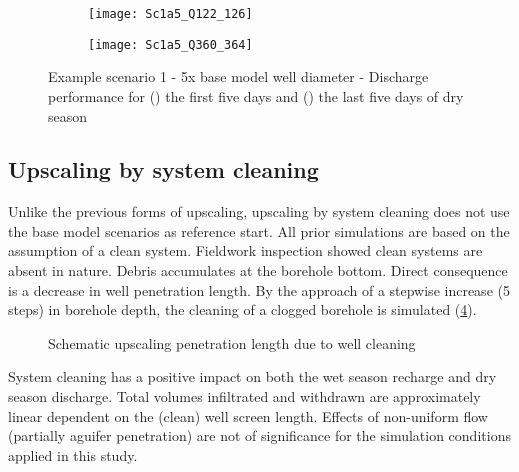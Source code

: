 \begin{figure}[H]
	\centering
	\begin{subfigure}[b]{0.5\linewidth}
		\centering\texttt{[image: Sc1a5\_Q122\_126]}
		\captionsetup{justification=centering}		
		\caption{\label{fig:Sc1a5_Q122_126}}
		\end{subfigure}\hfill
	\begin{subfigure}[b]{0.5\linewidth}
        \centering\texttt{[image: Sc1a5\_Q360\_364]}
		\captionsetup{justification=centering}		
		\caption{\label{fig:Sc1a5_Q360_364}}
		\end{subfigure}
		\captionsetup{justification=centering}	
	\caption{Example scenario 1 - 5x base model well diameter - Discharge performance for () the first five days and () the last five days of dry season} 
	\label{fig:Example_Sc1_5x_diam_discharge}
\end{figure} 


\subsection{Upscaling by system cleaning}
\label{subsec:Up_clean}
Unlike the previous forms of upscaling, upscaling by system cleaning does not use the base model scenarios as reference start. All prior simulations are based on the assumption of a clean system. Fieldwork inspection showed clean systems are absent in nature. Debris accumulates at the borehole bottom. Direct consequence is a decrease in well penetration length. By the approach of a stepwise increase (5 steps) in borehole depth, the cleaning of a clogged borehole is simulated (\ref{fig:Schematic_up_clean}).   

\begin{figure}[H]
\centering
{}
\captionsetup{justification=centering}
\caption{Schematic upscaling penetration length due to well cleaning}
\label{fig:Schematic_up_clean}
\end{figure}

System cleaning has a positive impact on both the wet season recharge and dry season discharge. Total volumes infiltrated and withdrawn are approximately linear dependent on the (clean) well screen length. Effects of non-uniform flow (partially aguifer penetration) are not of significance for the simulation conditions applied in this study.  

